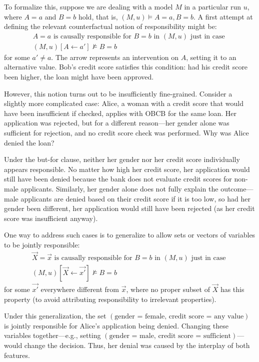 \documentclass{article}
\begin{document}
To formalize this, suppose we are dealing with a model $M$ in a particular run $u$, where $A=a$ and $B=b$ hold, that is, $(M, u) \models A=a, B=b$.  
A first attempt at defining the relevant counterfactual notion of responsibility might be:
\begin{align*}
A=a \text{ is causally responsible for } B=b \text{ in } (M, u) \text{ just in case } \\   (M, u)[A \leftarrow a'] \not \models B=b
\end{align*}
for some $a' \neq a$. The arrow represents an intervention on $A$, setting it to an alternative value. Bob’s credit score satisfies this condition: had his credit score been higher, the loan might have been approved.  

However, this notion turns out to be insufficiently fine-grained. Consider a slightly more complicated case: Alice, a woman with a credit score that would have been insufficient if checked, applies with OBCB for the same loan. Her application was rejected, but for a different reason---her gender alone was sufficient for rejection, and no credit score check was performed. Why was Alice denied the loan?  

Under the but-for clause, neither her gender nor her credit score individually appears responsible. No matter how high her credit score, her application would still have been denied because the bank does not evaluate credit scores for non-male applicants. Similarly, her gender alone does not fully explain the outcome—male applicants are denied based on their credit score if it is too low, so had her gender been different, her application would still have been rejected (as her credit score was insufficient anyway).

One way to address such cases is to generalize to allow sets or vectors of variables to be jointly responsible:
\begin{align*}
\vec{X} = \vec{x} \text{ is causally responsible for } B=b \text{ in } (M, u) \text{ just in case } \\  (M, u)[\vec{X} \leftarrow \vec{x'}] \not \models B=b
\end{align*}
for some $\vec{x'}$ everywhere different from $\vec{x}$, where no proper subset of $\vec{X}$ has this property (to avoid attributing responsibility to irrelevant properties).  

Under this generalization, the set $(\text{gender = female, credit score = any value})$ is jointly responsible for Alice's application being denied. Changing these variables together---e.g., setting $(\text{gender = male, credit score = sufficient})$—would change the decision. Thus, her denial was caused by the interplay of both features.
\end{document}
